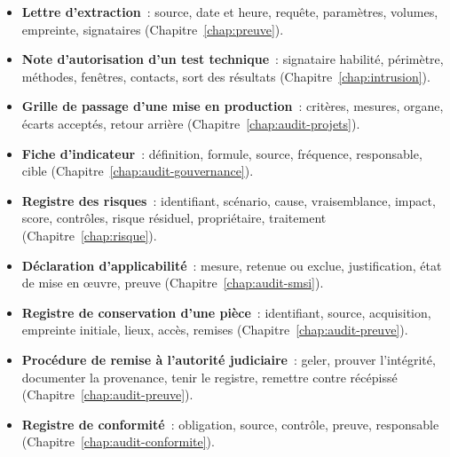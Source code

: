 \begin{itemize}
    \item \textbf{Lettre d'extraction}~: source, date et heure, requête,
          paramètres, volumes, empreinte, signataires
          (Chapitre~\ref{chap:preuve}).
    \item \textbf{Note d'autorisation d'un test technique}~: signataire
          habilité, périmètre, méthodes, fenêtres, contacts, sort des
          résultats (Chapitre~\ref{chap:intrusion}).
    \item \textbf{Grille de passage d'une mise en production}~: critères,
          mesures, organe, écarts acceptés, retour arrière
          (Chapitre~\ref{chap:audit-projets}).
    \item \textbf{Fiche d'indicateur}~: définition, formule, source,
          fréquence, responsable, cible (Chapitre~\ref{chap:audit-gouvernance}).
    \item \textbf{Registre des risques}~: identifiant, scénario, cause,
          vraisemblance, impact, score, contrôles, risque résiduel,
          propriétaire, traitement (Chapitre~\ref{chap:risque}).
    \item \textbf{Déclaration d'applicabilité}~: mesure, retenue ou exclue,
          justification, état de mise en œuvre, preuve
          (Chapitre~\ref{chap:audit-smsi}).
    \item \textbf{Registre de conservation d'une pièce}~: identifiant,
          source, acquisition, empreinte initiale, lieux, accès, remises
          (Chapitre~\ref{chap:audit-preuve}).
    \item \textbf{Procédure de remise à l'autorité judiciaire}~: geler,
          prouver l'intégrité, documenter la provenance, tenir le registre,
          remettre contre récépissé (Chapitre~\ref{chap:audit-preuve}).
    \item \textbf{Registre de conformité}~: obligation, source, contrôle,
          preuve, responsable (Chapitre~\ref{chap:audit-conformite}).
\end{itemize}

